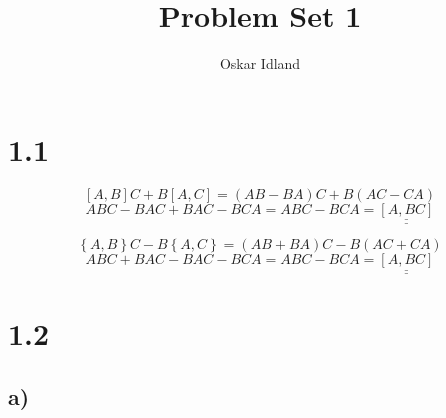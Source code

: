 \documentclass{article}
\author{Oskar Idland}
\title{Problem Set 1}
\date{}
\begin{document}
\maketitle
\newpage

\section*{1.1}
\[
\left[A,B\right]C + B\left[A,C\right] = \left(AB - BA \right)C + B\left(AC - CA\right) 
\]
\[
ABC - BAC + BAC - BCA = ABC - BCA = \underline{\underline{\left[A,BC\right]}}
\]

\[
\left\{A,B\right\}C - B\left\{A,C\right\} = \left(AB + BA\right)C - B\left(AC + CA\right)
\]
\[
ABC + BAC - BAC - BCA = ABC - BCA = \underline{\underline{\left[A,BC\right]}}
\]

\section*{1.2}
\subsection*{a)}
\end{document}
